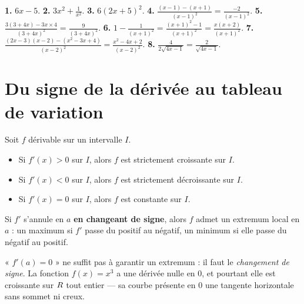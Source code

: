 \begin{corrige}
\textbf{1.} $6x-5$.
\textbf{2.} $3x^{2}+\frac{1}{x^{2}}$.
\textbf{3.} $6(2x+5)^{2}$.
\textbf{4.} $\frac{(x-1)-(x+1)}{(x-1)^{2}} = \frac{-2}{(x-1)^{2}}$.
\textbf{5.} $\frac{3(3+4x)-3x\times4}{(3+4x)^{2}} = \frac{9}{(3+4x)^{2}}$.
\textbf{6.} $1-\frac{1}{(x+1)^{2}} = \frac{(x+1)^{2}-1}{(x+1)^{2}}
= \frac{x(x+2)}{(x+1)^{2}}$.
\textbf{7.} $\frac{(2x-3)(x-2)-(x^{2}-3x+4)}{(x-2)^{2}}
= \frac{x^{2}-4x+2}{(x-2)^{2}}$.
\textbf{8.} $\frac{4}{2\sqrt{4x-1}} = \frac{2}{\sqrt{4x-1}}$.
\end{corrige}

\section{Du signe de la dérivée au tableau de variation}

\begin{theoreme}
Soit $f$ dérivable sur un intervalle $I$.
\begin{itemize}[leftmargin=1.3em, itemsep=0.15em]
  \item Si $f'(x) > 0$ sur $I$, alors $f$ est strictement croissante sur
        $I$.
  \item Si $f'(x) < 0$ sur $I$, alors $f$ est strictement décroissante sur
        $I$.
  \item Si $f'(x) = 0$ sur $I$, alors $f$ est constante sur $I$.
\end{itemize}
\end{theoreme}

\begin{propriete}[extremum]
Si $f'$ s'annule en $a$ \textbf{en changeant de signe}, alors $f$ admet un
extremum local en $a$ : un maximum si $f'$ passe du positif au négatif, un
minimum si elle passe du négatif au positif.
\end{propriete}

\begin{avertissement}
« $f'(a) = 0$ » ne suffit pas à garantir un extremum : il faut le
\emph{changement de signe}. La fonction $f(x) = x^{3}$ a une dérivée nulle en
$0$, et pourtant elle est croissante sur $R$ tout entier — sa courbe
présente en $0$ une tangente horizontale sans sommet ni creux.
\end{avertissement}

